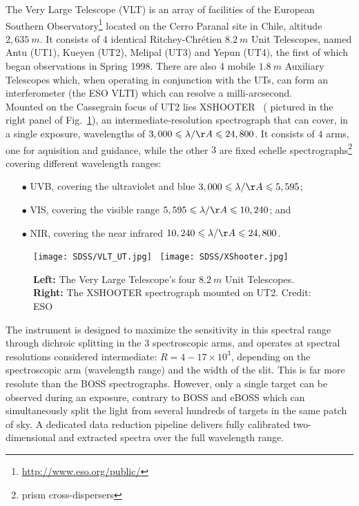 The Very Large Telescope (VLT) is an array of facilities of the European Southern Observatory\footnote{\url{http://www.eso.org/public/}} located on the Cerro Paranal site in Chile, altitude $2,635~m$. It consists of 4 identical Ritchey-Chr\'etien $8.2~m$ Unit Telescopes, named Antu (UT1), Kueyen (UT2), Melipal (UT3) and Yepun (UT4), the first of which began observations in Spring 1998. There are also 4 mobile $1.8~m$ Auxiliary Telescopes which, when operating in conjunction with the UTs, can form an interferometer (the ESO VLTI) which can resolve a milli-arcsecond. \\

Mounted on the Cassegrain focus of UT2 lies XSHOOTER~\citep{XShooter} ( pictured in the right panel of Fig.~\ref{fig:vlt_telescope}), an intermediate-resolution spectrograph that can cover, in a single exposure, wavelengths of $3,000 \leqslant \lambda / {\AA} \leqslant 24,800$. It consists of $4$ arms, one for aquisition and guidance, while the other $3$ are fixed echelle spectrographs\footnote{prism cross-dispersers} covering different wavelength ranges:\\

\begin{itemize}
\item[$\bullet$] UVB, covering the ultraviolet and blue $3,000 \leqslant \lambda / {\AA} \leqslant 5,595$; \\
\item[$\bullet$] VIS, covering the visible range $5,595 \leqslant \lambda / {\AA} \leqslant 10,240$; and \\
\item[$\bullet$] NIR, covering the near infrared $10,240 \leqslant \lambda / {\AA} \leqslant 24,800$. \\
\end{itemize}

\begin{figure}
\begin{center}
\texttt{[image: SDSS/VLT\_UT.jpg]}~%
\texttt{[image: SDSS/XShooter.jpg]}
\caption{\textbf{Left:} The Very Large Telescope's four $8.2~m$ Unit Telescopes. \textbf{Right:} The XSHOOTER spectrograph mounted on UT2. Credit: ESO}
\label{fig:vlt_telescope}
\end{center}
\end{figure}


The instrument is designed to maximize the sensitivity in this spectral range through dichroic splitting in the $3$ spectroscopic arms, and operates at spectral resolutions considered intermediate: $R=4-17 \times 10^3$, depending on the spectroscopic arm (wavelength range) and the width of the slit. This is far more resolute than the BOSS spectrographs. However, only a single target can be observed during an exposure, contrary to BOSS and eBOSS which can simultaneously split the light from several hundreds of targets in the same patch of sky. A dedicated data reduction pipeline delivers fully calibrated two-dimensional and extracted spectra over the full wavelength range. \\

